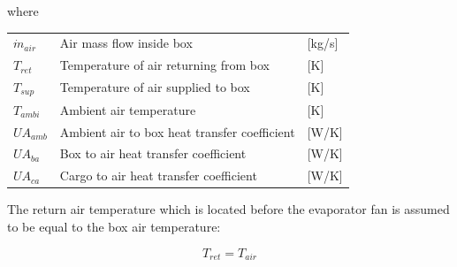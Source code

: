 where
\begin{center}
	\begin{tabular}{l p{8cm} l}
		$\dot{m}_{air}$ & Air mass flow inside box                     & [\si{kg}/{\si{s}}] \\
		$T_{ret}$       & Temperature of air returning from box        & [\si{K}]           \\
		$T_{sup}$       & Temperature of air supplied to box           & [\si{K}]           \\
		$T_{ambi}$      & Ambient air temperature                      & [\si{K}]           \\
		$U A_{amb}$     & Ambient air to box heat transfer coefficient & [\si{W}/\si{K}]    \\
		$U A_{ba}$      & Box to air heat transfer coefficient         & [\si{W}/\si{K}]    \\
		$U A_{ca}$      & Cargo to air heat transfer coefficient       & [\si{W}/\si{K}]
	\end{tabular}
\end{center}


The return air temperature which is located before the evaporator fan is assumed to be equal to the box air temperature:

\begin{equation} \label{eq:box_Tref}
	T_{ret} = T_{air}
\end{equation}




